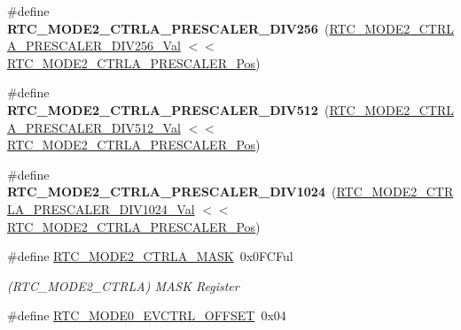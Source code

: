 \begin{DoxyCompactItemize}
\item 
\hypertarget{group___s_a_m_l21___r_t_c_gafd0dff5af2df83add99f2700c5f6ad44}{}\#define {\bfseries R\+T\+C\+\_\+\+M\+O\+D\+E2\+\_\+\+C\+T\+R\+L\+A\+\_\+\+P\+R\+E\+S\+C\+A\+L\+E\+R\+\_\+\+D\+I\+V256}~(\hyperlink{group___s_a_m_l21___r_t_c_gadbb925a049a91ee8fdf22219a212a159}{R\+T\+C\+\_\+\+M\+O\+D\+E2\+\_\+\+C\+T\+R\+L\+A\+\_\+\+P\+R\+E\+S\+C\+A\+L\+E\+R\+\_\+\+D\+I\+V256\+\_\+\+Val} $<$$<$ \hyperlink{group___s_a_m_l21___r_t_c_ga8ceb43a4478f656d6288fabd99a094fb}{R\+T\+C\+\_\+\+M\+O\+D\+E2\+\_\+\+C\+T\+R\+L\+A\+\_\+\+P\+R\+E\+S\+C\+A\+L\+E\+R\+\_\+\+Pos})\label{group___s_a_m_l21___r_t_c_gafd0dff5af2df83add99f2700c5f6ad44}

\item 
\hypertarget{group___s_a_m_l21___r_t_c_gad7d85539aded331076e63bb31b0146e3}{}\#define {\bfseries R\+T\+C\+\_\+\+M\+O\+D\+E2\+\_\+\+C\+T\+R\+L\+A\+\_\+\+P\+R\+E\+S\+C\+A\+L\+E\+R\+\_\+\+D\+I\+V512}~(\hyperlink{group___s_a_m_l21___r_t_c_gabf337845971381f76b43e11bd52f326b}{R\+T\+C\+\_\+\+M\+O\+D\+E2\+\_\+\+C\+T\+R\+L\+A\+\_\+\+P\+R\+E\+S\+C\+A\+L\+E\+R\+\_\+\+D\+I\+V512\+\_\+\+Val} $<$$<$ \hyperlink{group___s_a_m_l21___r_t_c_ga8ceb43a4478f656d6288fabd99a094fb}{R\+T\+C\+\_\+\+M\+O\+D\+E2\+\_\+\+C\+T\+R\+L\+A\+\_\+\+P\+R\+E\+S\+C\+A\+L\+E\+R\+\_\+\+Pos})\label{group___s_a_m_l21___r_t_c_gad7d85539aded331076e63bb31b0146e3}

\item 
\hypertarget{group___s_a_m_l21___r_t_c_ga15c8cfd4fc9f1b54b7a5feee80b6c054}{}\#define {\bfseries R\+T\+C\+\_\+\+M\+O\+D\+E2\+\_\+\+C\+T\+R\+L\+A\+\_\+\+P\+R\+E\+S\+C\+A\+L\+E\+R\+\_\+\+D\+I\+V1024}~(\hyperlink{group___s_a_m_l21___r_t_c_gac684af53e262ac2783c710bb59c0c008}{R\+T\+C\+\_\+\+M\+O\+D\+E2\+\_\+\+C\+T\+R\+L\+A\+\_\+\+P\+R\+E\+S\+C\+A\+L\+E\+R\+\_\+\+D\+I\+V1024\+\_\+\+Val} $<$$<$ \hyperlink{group___s_a_m_l21___r_t_c_ga8ceb43a4478f656d6288fabd99a094fb}{R\+T\+C\+\_\+\+M\+O\+D\+E2\+\_\+\+C\+T\+R\+L\+A\+\_\+\+P\+R\+E\+S\+C\+A\+L\+E\+R\+\_\+\+Pos})\label{group___s_a_m_l21___r_t_c_ga15c8cfd4fc9f1b54b7a5feee80b6c054}

\item 
\hypertarget{group___s_a_m_l21___r_t_c_ga5d9143f9cd05a49ebffe5a9c5163252f}{}\#define \hyperlink{group___s_a_m_l21___r_t_c_ga5d9143f9cd05a49ebffe5a9c5163252f}{R\+T\+C\+\_\+\+M\+O\+D\+E2\+\_\+\+C\+T\+R\+L\+A\+\_\+\+M\+A\+S\+K}~0x0\+F\+C\+Ful\label{group___s_a_m_l21___r_t_c_ga5d9143f9cd05a49ebffe5a9c5163252f}

\begin{DoxyCompactList}\small\item\em (R\+T\+C\+\_\+\+M\+O\+D\+E2\+\_\+\+C\+T\+R\+L\+A) M\+A\+S\+K Register \end{DoxyCompactList}\item 
\hypertarget{group___s_a_m_l21___r_t_c_ga6d4832ca646b389b86fceaca627cdc67}{}\#define \hyperlink{group___s_a_m_l21___r_t_c_ga6d4832ca646b389b86fceaca627cdc67}{R\+T\+C\+\_\+\+M\+O\+D\+E0\+\_\+\+E\+V\+C\+T\+R\+L\+\_\+\+O\+F\+F\+S\+E\+T}~0x04\label{group___s_a_m_l21___r_t_c_ga6d4832ca646b389b86fceaca627cdc67}


\end{DoxyCompactItemize}
